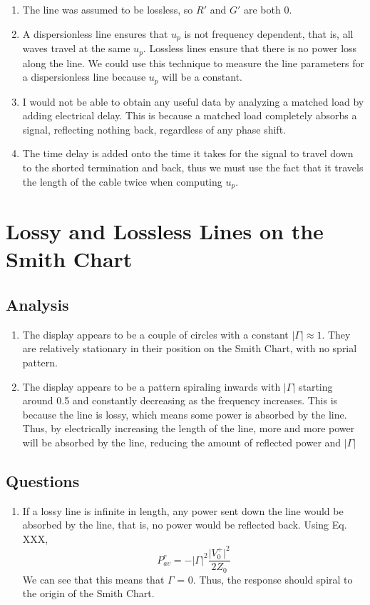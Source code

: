 \documentclass{article}
\begin{document}
\begin{enumerate}
	\item The line was assumed to be lossless, so $R'$ and $G'$ are both 0.
	\item A dispersionless line ensures that $u_p$ is not frequency dependent, that is, all waves travel at the same $u_p$. Lossless lines ensure that there is no power loss along the line. We could use this technique to measure the line parameters for a dispersionless line because $u_p$ will be a constant.
	\item I would not be able to obtain any useful data by analyzing a matched load by adding electrical delay. This is because a matched load completely absorbs a signal, reflecting nothing back, regardless of any phase shift.
	\item The time delay is added onto the time it takes for the signal to travel down to the shorted termination and back, thus we must use the fact that it travels the length of the cable twice when computing $u_p$.
\end{enumerate}


\section{Lossy and Lossless Lines on the Smith Chart}

\subsection{Analysis}
\begin{enumerate}
	\item The display appears to be a couple of circles with a constant $\vert\Gamma\vert\approx 1$. They are relatively stationary in their position on the Smith Chart, with no sprial pattern.
	\item The display appears to be a pattern spiraling inwards with $\vert\Gamma\vert$ starting around 0.5 and constantly decreasing as the frequency increases. This is because the line is lossy, which means some power is absorbed by the line. Thus, by electrically increasing the length of the line, more and more power will be absorbed by the line, reducing the amount of reflected power and $\vert\Gamma\vert$
\end{enumerate}

\subsection{Questions}
\begin{enumerate}
	\item If a lossy line is infinite in length, any power sent down the line would be absorbed by the line, that is, no power would be reflected back. Using Eq. XXX, 
	\begin{equation}
		P_{av}^r = -\vert\Gamma\vert^2 \frac{\vert V_0^+\vert^2}{2Z_0}
	\end{equation}
We can see that this means that $\Gamma$ = 0. Thus, the response should spiral to the origin of the Smith Chart.
\end{enumerate}
\end{document}
